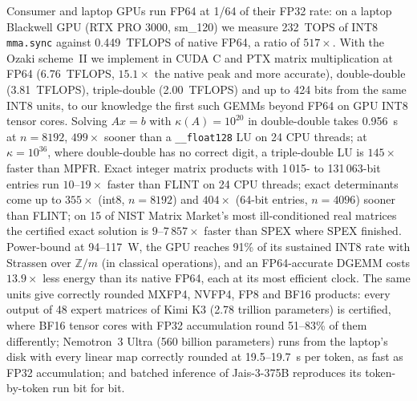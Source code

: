 Consumer and laptop GPUs run FP64 at 1/64 of their FP32 rate: on a laptop Blackwell GPU (RTX PRO 3000, sm\_120) we measure
232~TOPS of INT8 \texttt{mma.sync} against 0.449~TFLOPS of native FP64, a ratio of $517\times$. With the Ozaki scheme~II
we implement in CUDA C and PTX matrix multiplication at FP64 (6.76~TFLOPS, $15.1\times$ the native peak and more accurate),
double-double (3.81~TFLOPS), triple-double (2.00~TFLOPS) and up to 424 bits from the same INT8 units, to our knowledge the
first such GEMMs beyond FP64 on GPU INT8 tensor cores. Solving $Ax=b$ with $\kappa(A)=10^{20}$ in double-double takes 0.956~s at
$n=8192$, $499\times$ sooner than a \texttt{\_\_float128} LU on 24 CPU threads; at $\kappa=10^{36}$, where double-double has
no correct digit, a triple-double LU is $145\times$ faster than MPFR. Exact integer matrix products with 1\,015- to
131\,063-bit entries run $10$--$19\times$ faster than FLINT on 24 CPU threads; exact determinants come up to $355\times$
(int8, $n=8192$) and $404\times$ (64-bit entries, $n=4096$) sooner than FLINT; on 15 of NIST Matrix Market's most ill-conditioned real
matrices the certified exact solution is $9$--$7\,857\times$ faster than SPEX where SPEX finished. Power-bound at
94--117~W, the GPU reaches 91\% of its sustained INT8 rate with Strassen over $\mathbb{Z}/m$ (in classical operations), and
an FP64-accurate DGEMM costs $13.9\times$ less energy than its native FP64, each at its most efficient clock. The same units
give correctly rounded MXFP4, NVFP4, FP8 and BF16 products: every output of 48 expert matrices of Kimi K3 (2.78 trillion
parameters) is certified, where BF16 tensor cores with FP32 accumulation round 51--83\% of them differently; Nemotron~3
Ultra (560 billion parameters) runs from the laptop's disk with every linear map correctly rounded at 19.5--19.7~s per token, as
fast as FP32 accumulation; and batched inference of Jais-3-375B reproduces its token-by-token run bit for bit.
